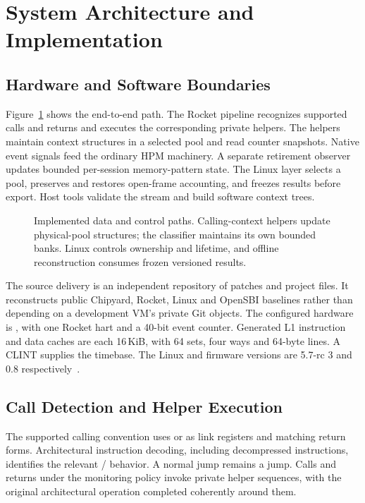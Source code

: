 \section{System Architecture and Implementation}
\label{sec:architecture}
\subsection{Hardware and Software Boundaries}
Figure~\ref{fig:architecture} shows the end-to-end path. The Rocket pipeline recognizes supported calls and returns and executes the corresponding private helpers. The helpers maintain context structures in a selected pool and read counter snapshots. Native event signals feed the ordinary HPM machinery. A separate retirement observer updates bounded per-session memory-pattern state. The Linux layer selects a pool, preserves and restores open-frame accounting, and freezes results before export. Host tools validate the stream and build software context trees.

\begin{figure}[t]
\centering
\caption{Implemented data and control paths. Calling-context helpers update physical-pool structures; the classifier maintains its own bounded banks. Linux controls ownership and lifetime, and offline reconstruction consumes frozen versioned results.}
\label{fig:architecture}
\end{figure}

The source delivery is an independent repository of patches and project files. It reconstructs public Chipyard, Rocket, Linux and OpenSBI baselines rather than depending on a development VM's private Git objects. The configured hardware is , with one Rocket hart and a 40-bit event counter. Generated L1 instruction and data caches are each 16\,KiB, with 64 sets, four ways and 64-byte lines. A CLINT supplies the timebase. The Linux and firmware versions are 5.7-rc 3 and 0.8 respectively~\citep{linux,opensbi}.

\subsection{Call Detection and Helper Execution}
The supported calling convention uses  or  as link registers and matching return forms. Architectural instruction decoding, including decompressed instructions, identifies the relevant / behavior. A normal jump remains a jump. Calls and returns under the monitoring policy invoke private helper sequences, with the original architectural operation completed coherently around them.

